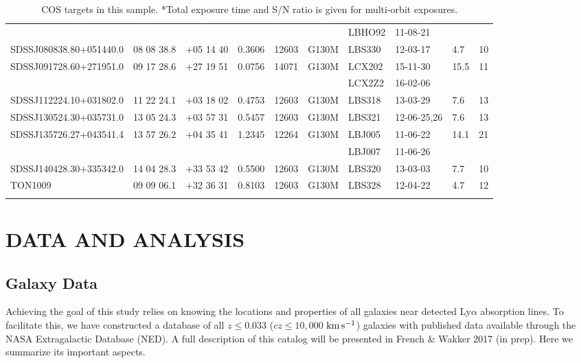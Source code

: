 \documentclass[twocolumn,tighten]{aastex6}
\begin{document}
\begin{table}[ht]
\begin{center}
\begin{tabular}{l l l l l l l l l l}
				        	     	& 	               &			&    	  	 	&		&			&   LBHO92	& 11-08-21		   &          &                   \\
SDSSJ080838.80+051440.0 	&  08 08 38.8  &  +05 14 40	&   0.3606  	& 12603	&   G130M	&   LBS330	& 12-03-17  		   &   4.7  &      10         \\
SDSSJ091728.60+271951.0 	&  09 17 28.6  &  +27 19 51	&   0.0756  	& 14071	&   G130M	&   LCX202	& 15-11-30		   & 15.5  &      11         \\
				        	     	& 	  	      &				&    	  	 	&		&			&   LCX2Z2	& 16-02-06		   &          &                   \\
SDSSJ112224.10+031802.0 	&  11 22 24.1  &  +03 18 02	&   0.4753  	& 12603	&   G130M	&   LBS318	& 13-03-29		   &   7.6  &      13         \\
SDSSJ130524.30+035731.0 	&  13 05 24.3  &  +03 57 31	&   0.5457  	& 12603	&   G130M	&   LBS321	& 12-06-25,26		   &   7.6  &      13         \\
SDSSJ135726.27+043541.4 	&  13 57 26.2  &  +04 35 41	&   1.2345  	& 12264	&   G130M	&   LBJ005	& 11-06-22		   & 14.1  &      21         \\
				        	     	& 	  	      &				&    	  	 	&		&			&   LBJ007	& 11-06-26		   &          &                   \\
SDSSJ140428.30+335342.0 	&  14 04 28.3  &  +33 53 42	&   0.5500  	& 12603	&   G130M	&  LBS320	& 13-03-03   		   &   7.7  &      10          \\
TON1009  			    	&  09 09 06.1  &  +32 36 31	&   0.8103  	& 12603	&   G130M	&  LBS328	& 12-04-22   		   &   4.7  &      12         \\

 \\
\hline

\end{tabular}
\end{center}
  \caption{\small{COS targets in this sample. *Total exposure time and S/N ratio is given for multi-orbit exposures.}}
  \label{target_table}
\end{table}


\section{DATA AND ANALYSIS}

\subsection{Galaxy Data}
Achieving the goal of this study relies on knowing the locations and properties of all galaxies near detected Ly$\alpha$ absorption lines. To facilitate this, we have constructed a database of all $z\leq 0.033$ ($cz\leq 10,000$ $\rm km\, s^{-1}$) galaxies with published data available through the NASA Extragalactic Database (NED). A full description of this catalog will be presented in French $\&$ Wakker 2017 (in prep). Here we summarize its important aspects. 
\end{document}
